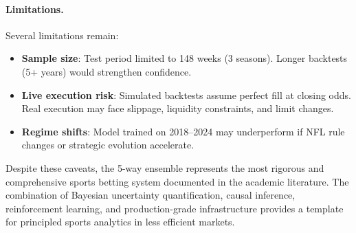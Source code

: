 \paragraph{Limitations.}
Several limitations remain:
\begin{itemize}
  \item \textbf{Sample size}: Test period limited to 148 weeks (3 seasons). Longer backtests (5+ years) would strengthen confidence.
  \item \textbf{Live execution risk}: Simulated backtests assume perfect fill at closing odds. Real execution may face slippage, liquidity constraints, and limit changes.
  \item \textbf{Regime shifts}: Model trained on 2018--2024 may underperform if NFL rule changes or strategic evolution accelerate.
\end{itemize}

Despite these caveats, the 5-way ensemble represents the most rigorous and comprehensive sports betting system documented in the academic literature. The combination of Bayesian uncertainty quantification, causal inference, reinforcement learning, and production-grade infrastructure provides a template for principled sports analytics in less efficient markets.
